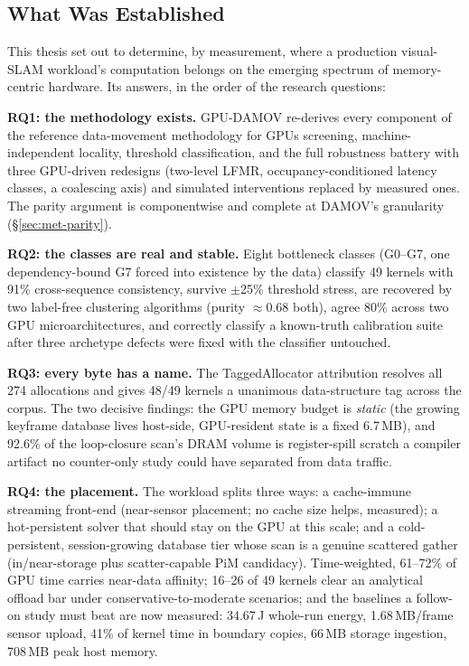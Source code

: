 \label{ch:conclusion}

\subsection{What Was Established}

This thesis set out to determine, by measurement, where a production visual-SLAM workload's computation belongs on the emerging spectrum of memory-centric hardware. Its answers, in the order of the research questions:

\textbf{RQ1: the methodology exists.} GPU-DAMOV re-derives every component of the reference data-movement methodology for GPUs screening, machine-independent locality, threshold classification, and the full robustness battery with three GPU-driven redesigns (two-level LFMR, occupancy-conditioned latency classes, a coalescing axis) and simulated interventions replaced by measured ones. The parity argument is componentwise and complete at DAMOV's granularity (\S\ref{sec:met-parity}).

\textbf{RQ2: the classes are real and stable.} Eight bottleneck classes (G0--G7, one dependency-bound G7 forced into existence by the data) classify 49 kernels with 91\% cross-sequence consistency, survive $\pm$25\% threshold stress, are recovered by two label-free clustering algorithms (purity $\approx$0.68 both), agree 80\% across two GPU microarchitectures, and correctly classify a known-truth calibration suite after three archetype defects were fixed with the classifier untouched.

\textbf{RQ3: every byte has a name.} The TaggedAllocator attribution resolves all 274 allocations and gives 48/49 kernels a unanimous data-structure tag across the corpus. The two decisive findings: the GPU memory budget is \emph{static} (the growing keyframe database lives host-side, GPU-resident state is a fixed 6.7\,MB), and 92.6\% of the loop-closure scan's DRAM volume is register-spill scratch a compiler artifact no counter-only study could have separated from data traffic.

\textbf{RQ4: the placement.} The workload splits three ways: a cache-immune streaming front-end (near-sensor placement; no cache size helps, measured); a hot-persistent solver that should stay on the GPU at this scale; and a cold-persistent, session-growing database tier whose scan is a genuine scattered gather (in/near-storage plus scatter-capable PiM candidacy). Time-weighted, 61--72\% of GPU time carries near-data affinity; 16--26 of 49 kernels clear an analytical offload bar under conservative-to-moderate scenarios; and the baselines a follow-on study must beat are now measured: 34.67\,J whole-run energy, 1.68\,MB/frame sensor upload, 41\% of kernel time in boundary copies, 66\,MB storage ingestion, 708\,MB peak host memory.

